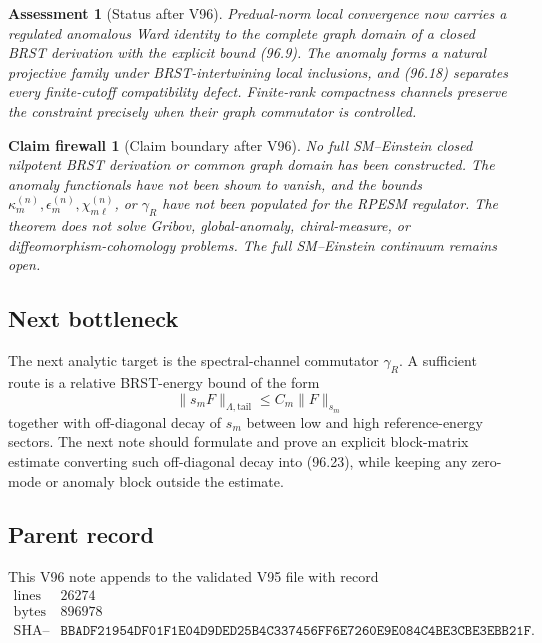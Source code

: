 \documentclass[11pt]{article}
\newtheorem{firewall}[theorem]{Claim firewall}
\newtheorem{assessment}[theorem]{Assessment}
\theoremstyle{remark}
\begin{document}
\begin{assessment}[Status after V96]
\label{ass:v12v96-status}
Predual-norm local convergence now carries a regulated anomalous
Ward identity to the complete graph domain of a closed BRST
derivation with the explicit bound (96.9).  The anomaly forms a
natural projective family under BRST-intertwining local inclusions,
and (96.18) separates every finite-cutoff compatibility defect.
Finite-rank compactness channels preserve the constraint precisely
when their graph commutator is controlled.
\end{assessment}

\begin{firewall}[Claim boundary after V96]
\label{fire:v12v96-claim}
No full SM--Einstein closed nilpotent BRST derivation or common graph
domain has been constructed.  The anomaly functionals have not been
shown to vanish, and the bounds
\(\kappa_m^{(n)},\epsilon_m^{(n)},\chi_{m\ell}^{(n)}\), or
\(\gamma_R\) have not been populated for the RPESM regulator.
The theorem does not solve Gribov, global-anomaly, chiral-measure, or
diffeomorphism-cohomology problems.  The full SM--Einstein continuum
remains open.
\end{firewall}

\subsection{Next bottleneck}

The next analytic target is the spectral-channel commutator
\(\gamma_R\).  A sufficient route is a relative BRST-energy bound
of the form
\[
 \|s_mF\|_{\Lambda,\mathrm{tail}}
 \leq C_m\|F\|_{s_m}
\]
together with off-diagonal decay of \(s_m\) between low and high
reference-energy sectors.  The next note should formulate and prove
an explicit block-matrix estimate converting such off-diagonal
decay into (96.23), while keeping any zero-mode or anomaly block
outside the estimate.

\subsection{Parent record}

This V96 note appends to the validated V95 file with record
\[
\begin{array}{c|c}
\text{lines}&26274\\
\text{bytes}&896978\\
\text{SHA--256}&
\texttt{BBADF21954DF01F1E04D9DED25B4C337456FF6E7260E9E084C4BE3CBE3EBB21F}.
\end{array}
\]
\end{document}
